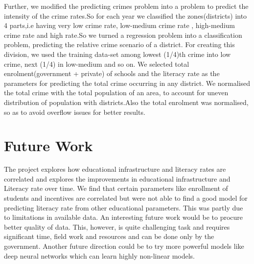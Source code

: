 \documentclass[twoside]{article}
\begin{document}
Further, we modified the predicting crimes problem into a problem to predict the intensity of the crime rates.So for each year we classified the zones(districts) into 4 parts,i.e having very low crime rate, low-medium crime rate , high-medium crime rate and high rate.So we turned a regression problem into a classification problem, predicting the relative crime scenario of a district.
For creating this division, we used the training data-set among lowest (1/4)th crime into low crime, next (1/4) in low-medium and so on.
We selected total enrolment(government + private) of schools and the literacy rate as the parameters for predicting the total crime occurring in any district.
We normalised the total crime with the total population of an area, to account for uneven distribution of population with districts.Also the total enrolment was normalised, so as to avoid overflow issues for better results.






\section*{Future Work}
The project explores how educational infrastructure and literacy rates are correlated and explores the improvements in educational infrastructure and Literacy rate over time. We find that certain parameters like enrollment of students and incentives are correlated but were not able to find a good model for predicting literacy rate from other educational parameters. This was partly due to limitations in available data. An interesting future work would be to procure better quality of data. This, however, is quite challenging task and requires significant time, field work and resources and can be done only by the government. Another future direction could be to try more powerful models like deep neural networks which can learn highly non-linear models.\\
\end{document}
